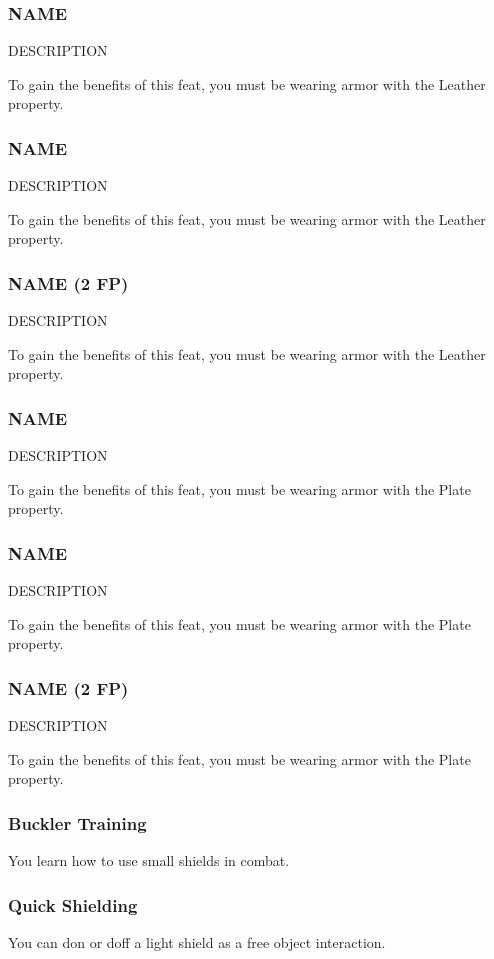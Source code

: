 \subsubsection{NAME} \label{feat::name}
    DESCRIPTION

    To gain the benefits of this feat, you must be wearing armor with the Leather property.
\subsubsection{NAME} \label{feat::name}
    DESCRIPTION

    To gain the benefits of this feat, you must be wearing armor with the Leather property.
\subsubsection{NAME (2 FP)} \label{feat::name}
    DESCRIPTION

    To gain the benefits of this feat, you must be wearing armor with the Leather property.
\subsubsection{NAME} \label{feat::name}
    DESCRIPTION

    To gain the benefits of this feat, you must be wearing armor with the Plate property.
\subsubsection{NAME} \label{feat::name}
    DESCRIPTION

    To gain the benefits of this feat, you must be wearing armor with the Plate property.
\subsubsection{NAME (2 FP)} \label{feat::name}
    DESCRIPTION

    To gain the benefits of this feat, you must be wearing armor with the Plate property.

\subsubsection{Buckler Training} \label{feat::bucklertraining}
    You learn how to use small shields in combat.
\subsubsection{Quick Shielding} \label{feat::quickshielding}
    You can don or doff a light shield as a free object interaction.
